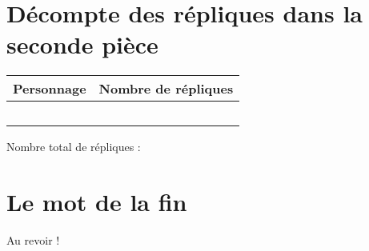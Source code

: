 \documentclass[11pt, a4paper]{report}
\begin{document}
	\section{Décompte des répliques dans la seconde pièce}
	\begin{center}
		\begin{tabular}{|c|c|}
			\hline Personnage & Nombre de répliques \\
			\hline \Marc & \theMarc \\
			\hline \Mathieu & \theMathieu \\
			\hline \Luc & \theLuc \\
			\hline \Jean & \theJean \\
			\hline \tous & \thetous \\
			\hline
		\end{tabular}
		
		Nombre total de répliques : \thetotalrepliques
	\end{center}
	\section{Le mot de la fin}
	
	Au revoir !
	
	
	
	
	
\end{document}
